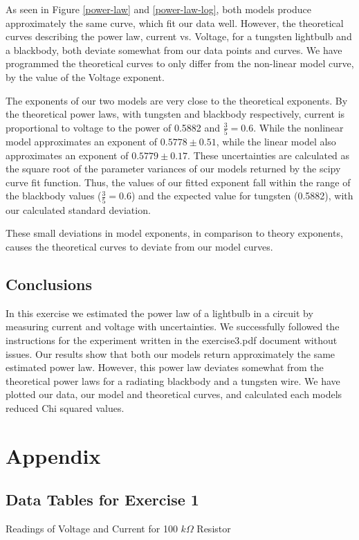 \documentclass[letterpaper,12pt]{article}
\begin{document}
As seen in Figure \ref{power-law} and \ref{power-law-log}, both models produce approximately the same curve, which fit our data well. However, the theoretical curves describing the power law, current vs. Voltage, for a tungsten lightbulb and a blackbody, both deviate somewhat from our data points and curves. We have programmed the theoretical curves to only differ from the non-linear model curve, by the value of the Voltage exponent.

The exponents of our two models are very close to the theoretical exponents. 
By the theoretical power laws, with tungsten and blackbody respectively, 
current is proportional to voltage to the power of 0.5882 and $\frac{3}{5} = 0.6$. 
While the nonlinear model approximates an exponent of $0.5778 \pm 0.51$,
while the linear model also approximates an exponent of $0.5779 \pm 0.17$. 
These uncertainties are calculated as the square root of the parameter 
variances of our models returned by the scipy curve fit function. 
Thus, the values of our fitted exponent fall within the range of the blackbody 
values ($\frac{3}{5}=0.6$) and the expected value for tungsten (0.5882), 
with our calculated standard deviation.

These small deviations in model exponents, in comparison to theory exponents, 
causes the theoretical curves to deviate from our model curves.

\subsection{Conclusions}

In this exercise we estimated the power law of a lightbulb in a circuit by measuring current and voltage with uncertainties. We successfully followed the instructions for the experiment written in the exercise3.pdf document without issues. Our results show that both our models return approximately the same estimated power law. However, this power law deviates somewhat from the theoretical power laws for a radiating blackbody and a tungsten wire. We have plotted our data, our model and theoretical curves, and calculated each models reduced Chi squared values. 

\pagebreak

\section{Appendix}

\subsection{Data Tables for Exercise 1}
\begin{table}[H]
  \centering
  \caption{Readings of Voltage and Current for 100 $k\Omega$ Resistor}
  \label{100kdata}
\end{table}
\end{document}
